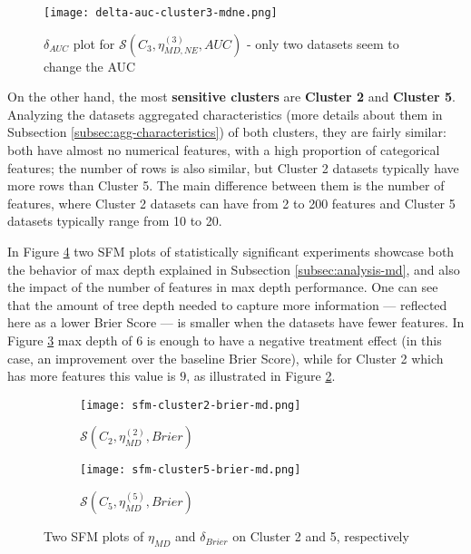 \begin{figure}[H]
    \centering
    \texttt{[image: delta-auc-cluster3-mdne.png]}
    \caption{$\delta_{AUC}$ plot for $\mathcal{S}(C_3, \eta^{(3)}_{MD, NE}, AUC)$ - only two datasets seem to change the AUC}
    \label{fig:delta-auc-cluster3-mdne}
\end{figure}

On the other hand, the most \textbf{sensitive clusters} are \textbf{Cluster 2} and \textbf{Cluster 5}. Analyzing the datasets aggregated characteristics (more details about them in Subsection \ref{subsec:agg-characteristics}) of both clusters, they are fairly similar: both have almost no numerical features, with a high proportion of categorical features; the number of rows is also similar, but Cluster 2 datasets typically have more rows than Cluster 5. The main difference between them is the number of features, where Cluster 2 datasets can have from 2 to 200 features and Cluster 5 datasets typically range from 10 to 20.

In Figure \ref{fig:sfm-cluster2-cluster5} two SFM plots of statistically significant experiments showcase both the behavior of max depth explained in Subsection \ref{subsec:analysis-md}, and also the impact of the number of features in max depth performance. One can see that the amount of tree depth needed to capture more information --- reflected here as a lower Brier Score --- is smaller when the datasets have fewer features. In Figure \ref{fig:sfm-c2c5-c5} max depth of $6$ is enough to have a negative treatment effect (in this case, an improvement over the baseline Brier Score), while for Cluster 2 which has more features this value is $9$, as illustrated in Figure \ref{fig:sfm-c2c5-c2}.


\begin{figure}[!h]
    \centering
    \begin{subfigure}[b]{0.49\textwidth}
        \centering
        \texttt{[image: sfm-cluster2-brier-md.png]}
        \caption{$\mathcal{S}(C_2, \eta^{(2)}_{MD}, Brier)$}
        \label{fig:sfm-c2c5-c2}
    \end{subfigure}
    \hfill
    \begin{subfigure}[b]{0.49\textwidth}
        \centering
        \texttt{[image: sfm-cluster5-brier-md.png]}
        \caption{$\mathcal{S}(C_5, \eta^{(5)}_{MD}, Brier)$}
        \label{fig:sfm-c2c5-c5}
    \end{subfigure}
    \hfill
       \caption{Two SFM plots of $\eta_{MD}$ and $\delta_{Brier}$ on Cluster 2 and 5, respectively}
       \label{fig:sfm-cluster2-cluster5}
\end{figure}


